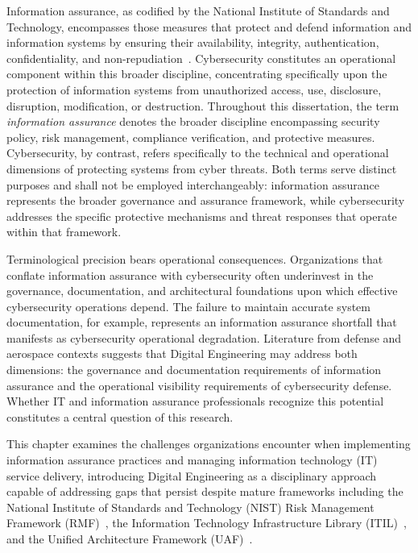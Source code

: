 Information assurance, as codified by the National Institute of Standards and Technology, encompasses those measures that protect and defend information and information systems by ensuring their availability, integrity, authentication, confidentiality, and non-repudiation~\parencite{Force_2020}. Cybersecurity constitutes an operational component within this broader discipline, concentrating specifically upon the protection of information systems from unauthorized access, use, disclosure, disruption, modification, or destruction. Throughout this dissertation, the term \textit{information assurance} denotes the broader discipline encompassing security policy, risk management, compliance verification, and protective measures. Cybersecurity, by contrast, refers specifically to the technical and operational dimensions of protecting systems from cyber threats. Both terms serve distinct purposes and shall not be employed interchangeably: information assurance represents the broader governance and assurance framework, while cybersecurity addresses the specific protective mechanisms and threat responses that operate within that framework.

Terminological precision bears operational consequences. Organizations that conflate information assurance with cybersecurity often underinvest in the governance, documentation, and architectural foundations upon which effective cybersecurity operations depend. The failure to maintain accurate system documentation, for example, represents an information assurance shortfall that manifests as cybersecurity operational degradation. Literature from defense and aerospace contexts suggests that Digital Engineering may address both dimensions: the governance and documentation requirements of information assurance and the operational visibility requirements of cybersecurity defense. Whether IT and information assurance professionals recognize this potential constitutes a central question of this research.

This chapter examines the challenges organizations encounter when implementing information assurance practices and managing information technology (IT) service delivery, introducing Digital Engineering as a disciplinary approach capable of addressing gaps that persist despite mature frameworks including the National Institute of Standards and Technology (NIST) Risk Management Framework (RMF)~\parencite{Force_2020}, the Information Technology Infrastructure Library (ITIL)~\parencite{Cannon_AXELOS_2013}, and the Unified Architecture Framework (UAF)~\parencite{OMG_UAF_2022}.

